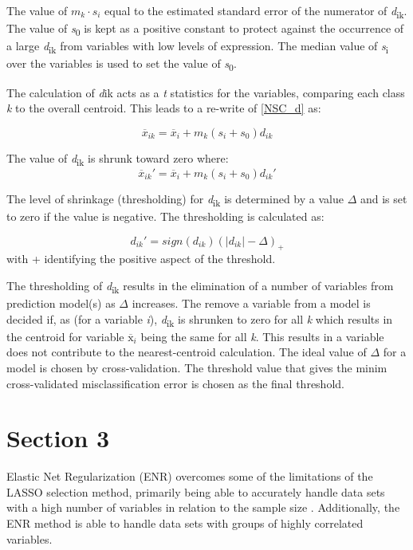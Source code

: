 The value of $m_k \cdot s_i$ equal to the estimated standard error of the numerator of \textit{d}\textsubscript{ik}. The value of \textit{s}\textsubscript{0} is kept as a positive constant to protect against the occurrence of a large \textit{d}\textsubscript{ik} from variables with low levels of expression. The median value of \textit{s}\textsubscript{i} over the variables is used to set the value of \textit{s}\textsubscript{0}.

The calculation of \textit{d}ik acts as a \textit{t} statistics for the variables, comparing each class \textit{k} to the overall centroid. This leads to a re-write of \ref{NSC_d} as:

\begin{equation} \label{NSC_drw}
\overline{x}_{ik} = \overline{x}_i + m_k (s_i + s_0)d_{ik}
\end{equation}

The value of \textit{d}\textsubscript{ik} is shrunk toward zero where:
\begin{equation} \label{NSC_drw_shrunk}
\overline{x}_{ik}' = \overline{x}_i + m_k (s_i + s_0)d_{ik}'
\end{equation}

The level of shrinkage (thresholding) for \textit{d}\textsubscript{ik} is determined by a value $\Delta$ and is set to zero if the value is negative. The thresholding is calculated as:

\begin{equation} \label{NSC_threshold}
d_{ik}' = sign(d_{ik})(|d_{ik}| - \Delta)_+
\end{equation}
with + identifying the positive aspect of the threshold.

The thresholding of \textit{d}\textsubscript{ik} results in the elimination of a number of variables from prediction model(s) as $\Delta$ increases. The remove a variable from a model is decided if, as (for a variable \textit{i}), \textit{d}\textsubscript{ik} is shrunken to zero for all \textit{k} which results in the centroid for variable $\overline{\mbox{x}}_i$ being the same for all \textit{k}. This results in a variable does not contribute to the nearest-centroid calculation. The ideal value of $\Delta$ for a model is chosen by cross-validation. The threshold value that gives the minim cross-validated misclassification error is chosen as the final threshold.

\section{Section 3}\label{Elasitc Net Regularization}
Elastic Net Regularization (ENR) overcomes some of the limitations of the LASSO selection method, primarily being able to accurately handle data sets with a high number of variables in relation to the sample size \cite{tibshirani1996regression,efron2004least}. Additionally, the ENR method is able to handle data sets with groups of highly correlated variables. 

